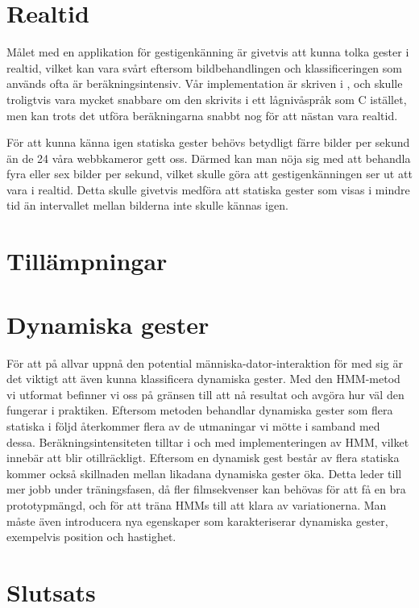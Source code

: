 \documentclass[../rapport_MVEX01-11-05]{subfiles}
\begin{document}
\section{Realtid}
Målet med en applikation för gestigenkänning är givetvis att kunna tolka
gester i realtid, vilket kan vara svårt eftersom bildbehandlingen och
klassificeringen som används ofta är beräkningsintensiv. Vår implementation
är skriven i \MATLAB, och skulle troligtvis vara mycket snabbare om den
skrivits i ett lågnivåspråk som C istället, men kan trots det utföra
beräkningarna snabbt nog för att nästan vara realtid.

För att kunna känna igen statiska gester behövs betydligt färre bilder per
sekund än de 24 våra webbkameror gett oss. Därmed kan man nöja sig med
att behandla fyra eller sex bilder per
sekund, vilket skulle göra att gestigenkänningen ser ut att vara i realtid.
Detta skulle givetvis medföra att statiska gester som visas i mindre tid
än intervallet mellan bilderna inte skulle kännas igen.


\section{Tillämpningar}


\section{Dynamiska gester}
För att på allvar uppnå den potential människa-dator-interaktion för med sig
är det viktigt att även kunna klassificera dynamiska gester. Med den HMM-metod 
vi utformat befinner vi oss på gränsen till att nå resultat och avgöra hur väl 
den fungerar i praktiken. Eftersom metoden behandlar dynamiska gester som flera 
statiska i följd återkommer flera av de utmaningar vi mötte i samband med dessa. 
Beräkningsintensiteten tilltar i och med implementeringen av HMM, vilket innebär 
att \MATLAB blir otillräckligt. Eftersom en dynamisk gest består av flera statiska
kommer också skillnaden mellan likadana dynamiska gester öka. Detta leder till 
mer jobb under träningsfasen, då fler filmsekvenser kan behövas för att få en 
bra prototypmängd, och för att träna HMMs till att klara av variationerna. 
Man måste även introducera nya egenskaper som karakteriserar dynamiska gester, 
exempelvis position och hastighet. 




\section{Slutsats}
\end{document}
